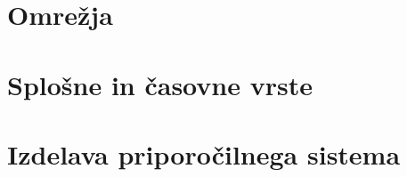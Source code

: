 %


\chapter{Omrežja}




\chapter{Splošne in časovne vrste}




\chapter{Izdelava priporočilnega sistema}

%





